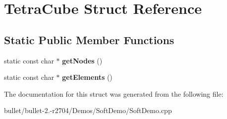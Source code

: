 \hypertarget{struct_tetra_cube}{\section{Tetra\+Cube Struct Reference}
\label{struct_tetra_cube}
}
\subsection*{Static Public Member Functions}
\begin{DoxyCompactItemize}
\item 
\hypertarget{struct_tetra_cube_abdd1dd25decc589744e924d7542a06a5}{static const char $\ast$ {\bfseries get\+Nodes} ()}\label{struct_tetra_cube_abdd1dd25decc589744e924d7542a06a5}

\item 
\hypertarget{struct_tetra_cube_a195e447850ca770f933928b9cab9b64c}{static const char $\ast$ {\bfseries get\+Elements} ()}\label{struct_tetra_cube_a195e447850ca770f933928b9cab9b64c}

\end{DoxyCompactItemize}


The documentation for this struct was generated from the following file\+:\begin{DoxyCompactItemize}
\item 
bullet/bullet-\/2.-\/r2704/\+Demos/\+Soft\+Demo/Soft\+Demo.\+cpp\end{DoxyCompactItemize}
